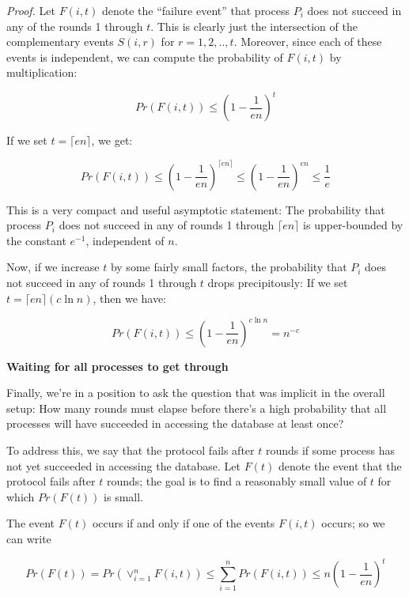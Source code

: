 
\textit{Proof.} Let $F(i, t)$ denote the “failure event” that process $P_i$ does not succeed in any of the rounds 1 through $t$. This is clearly just the intersection of the complementary events $S(i, r)$ for $r = 1, 2, .., t$. Moreover, since each of these events is independent, we can compute the probability of $F(i, t)$ by multiplication:

$$
Pr(F(i,t)) \leq \left( 1 - \frac{1}{en} \right)^t
$$

If we set $t = \lceil en \rceil$, we get:

$$
Pr(F(i,t)) \leq \left( 1 - \frac{1}{en} \right)^{\lceil en \rceil} \leq \left( 1 - \frac{1}{en} \right)^{en} \leq \frac{1}{e}
$$

This is a very compact and useful asymptotic statement: The probability that process $P_i$ does not succeed in any of rounds 1 through $\lceil en \rceil$ is upper-bounded by the constant $e^{-1}$, independent of $n$. 

Now, if we increase $t$ by some fairly small factors, the probability that $P_i$ does not succeed in any of rounds 1 through $t$ drops precipitously: If we set $t = \lceil en \rceil (c \ln n)$, then we have:

$$
Pr(F(i,t)) \leq \left( 1 - \frac{1}{en} \right)^{c \ln n} = n^{-c}
$$

\textbf{Waiting for all processes to get through}

Finally, we’re in a position to ask the question that was implicit in the overall setup: How many rounds must elapse before there’s a high probability that all processes will have succeeded in accessing the database at least once? 

To address this, we say that the protocol fails after $t$ rounds if some process has not yet succeeded in accessing the database. Let $F(t)$ denote the event that the protocol fails after $t$ rounds; the goal is to find a reasonably small value of $t$ for which $Pr(F(t))$ is small. 


The event $F(t)$ occurs if and only if one of the events $F(i, t)$ occurs; so we can write

$$
Pr(F(t)) = Pr \left( \lor_{i = 1}^n F(i,t) \right) \leq \sum_{i = 1}^n Pr(F(i,t)) \leq n \left( 1 - \frac{1}{en} \right)^t
$$

